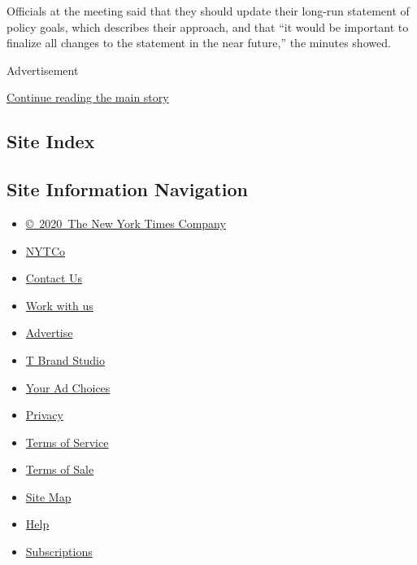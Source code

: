 Officials at the meeting said that they should update their long-run
statement of policy goals, which describes their approach, and that ``it
would be important to finalize all changes to the statement in the near
future,'' the minutes showed.

Advertisement

\protect\hyperlink{after-bottom}{Continue reading the main story}

\hypertarget{site-index}{%
\subsection{Site Index}\label{site-index}}

\hypertarget{site-information-navigation}{%
\subsection{Site Information
Navigation}\label{site-information-navigation}}

\begin{itemize}
\tightlist
\item
  \href{https://help.nytimes3xbfgragh.onion/hc/en-us/articles/115014792127-Copyright-notice}{©~2020~The
  New York Times Company}
\end{itemize}

\begin{itemize}
\tightlist
\item
  \href{https://www.nytco.com/}{NYTCo}
\item
  \href{https://help.nytimes3xbfgragh.onion/hc/en-us/articles/115015385887-Contact-Us}{Contact
  Us}
\item
  \href{https://www.nytco.com/careers/}{Work with us}
\item
  \href{https://nytmediakit.com/}{Advertise}
\item
  \href{http://www.tbrandstudio.com/}{T Brand Studio}
\item
  \href{https://www.nytimes3xbfgragh.onion/privacy/cookie-policy\#how-do-i-manage-trackers}{Your
  Ad Choices}
\item
  \href{https://www.nytimes3xbfgragh.onion/privacy}{Privacy}
\item
  \href{https://help.nytimes3xbfgragh.onion/hc/en-us/articles/115014893428-Terms-of-service}{Terms
  of Service}
\item
  \href{https://help.nytimes3xbfgragh.onion/hc/en-us/articles/115014893968-Terms-of-sale}{Terms
  of Sale}
\item
  \href{https://spiderbites.nytimes3xbfgragh.onion}{Site Map}
\item
  \href{https://help.nytimes3xbfgragh.onion/hc/en-us}{Help}
\item
  \href{https://www.nytimes3xbfgragh.onion/subscription?campaignId=37WXW}{Subscriptions}
\end{itemize}
